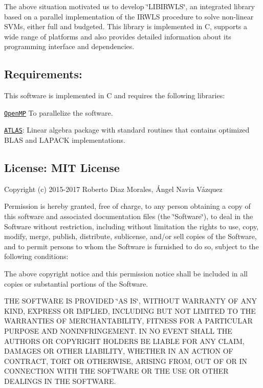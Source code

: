 The above situation motivated us to develop \char`\"{}\+L\+I\+B\+I\+R\+W\+L\+S\char`\"{}, an integrated library based on a parallel implementation of the I\+R\+W\+LS procedure to solve non-\/linear S\+V\+Ms, either full and budgeted. This library is implemented in C, supports a wide range of platforms and also provides detailed information about its programming interface and dependencies.

\subsection*{Requirements\+: }

This software is implemented in C and requires the following libraries\+:


\begin{DoxyItemize}
\item \href{http://openmp.org/wp/}{\tt Open\+MP} To parallelize the software.
\item \href{http://math-atlas.sourceforge.net/}{\tt A\+T\+L\+AS}\+: Linear algebra package with standard routines that contains optimized B\+L\+AS and L\+A\+P\+A\+CK implementations.
\end{DoxyItemize}

\subsection*{License\+: M\+IT License }

Copyright (c) 2015-\/2017 Roberto Diaz Morales, Ángel Navia Vázquez

Permission is hereby granted, free of charge, to any person obtaining a copy of this software and associated documentation files (the \char`\"{}\+Software\char`\"{}), to deal in the Software without restriction, including without limitation the rights to use, copy, modify, merge, publish, distribute, sublicense, and/or sell copies of the Software, and to permit persons to whom the Software is furnished to do so, subject to the following conditions\+:

The above copyright notice and this permission notice shall be included in all copies or substantial portions of the Software.

T\+HE S\+O\+F\+T\+W\+A\+RE IS P\+R\+O\+V\+I\+D\+ED \char`\"{}\+A\+S I\+S\char`\"{}, W\+I\+T\+H\+O\+UT W\+A\+R\+R\+A\+N\+TY OF A\+NY K\+I\+ND, E\+X\+P\+R\+E\+SS OR I\+M\+P\+L\+I\+ED, I\+N\+C\+L\+U\+D\+I\+NG B\+UT N\+OT L\+I\+M\+I\+T\+ED TO T\+HE W\+A\+R\+R\+A\+N\+T\+I\+ES OF M\+E\+R\+C\+H\+A\+N\+T\+A\+B\+I\+L\+I\+TY, F\+I\+T\+N\+E\+SS F\+OR A P\+A\+R\+T\+I\+C\+U\+L\+AR P\+U\+R\+P\+O\+SE A\+ND N\+O\+N\+I\+N\+F\+R\+I\+N\+G\+E\+M\+E\+NT. IN NO E\+V\+E\+NT S\+H\+A\+LL T\+HE A\+U\+T\+H\+O\+RS OR C\+O\+P\+Y\+R\+I\+G\+HT H\+O\+L\+D\+E\+RS BE L\+I\+A\+B\+LE F\+OR A\+NY C\+L\+A\+IM, D\+A\+M\+A\+G\+ES OR O\+T\+H\+ER L\+I\+A\+B\+I\+L\+I\+TY, W\+H\+E\+T\+H\+ER IN AN A\+C\+T\+I\+ON OF C\+O\+N\+T\+R\+A\+CT, T\+O\+RT OR O\+T\+H\+E\+R\+W\+I\+SE, A\+R\+I\+S\+I\+NG F\+R\+OM, O\+UT OF OR IN C\+O\+N\+N\+E\+C\+T\+I\+ON W\+I\+TH T\+HE S\+O\+F\+T\+W\+A\+RE OR T\+HE U\+SE OR O\+T\+H\+ER D\+E\+A\+L\+I\+N\+GS IN T\+HE S\+O\+F\+T\+W\+A\+RE. 